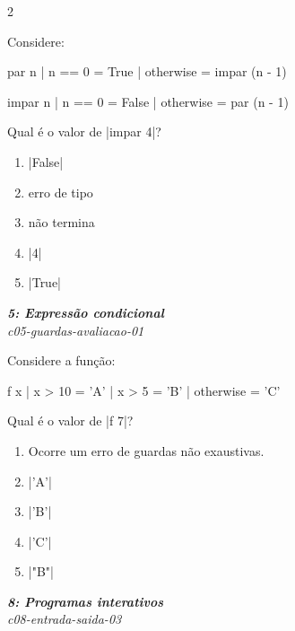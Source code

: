 \documentclass[a4paper,10pt,brazil]{article}
\begin{document}
\begin{multicols}{2}
\begin{flushright}
\end{flushright}
Considere:
\begin{haskellcode}
par n | n == 0 = True
      | otherwise = impar (n - 1)

impar n | n == 0 = False
        | otherwise = par (n - 1)
\end{haskellcode}
Qual é o valor de \haskellinline|impar 4|?

\begin{enumerate}
  \item \haskellinline|False|

  \item erro de tipo

  \item não termina

  \item \haskellinline|4|

  \item \haskellinline|True|


\end{enumerate}

\begin{flushright}
  \footnotesize
  \textit{\textbf{5: Expressão condicional}}\\
  \textit{c05-guardas-avaliacao-01}\\

\end{flushright}
Considere a função:
\begin{haskellcode}
f x
  | x > 10 = 'A'
  | x > 5  = 'B'
  | otherwise = 'C'
\end{haskellcode}
Qual é o valor de \haskellinline|f 7|?

\begin{enumerate}
  \item Ocorre um erro de guardas não exaustivas.

  \item \haskellinline|'A'|

  \item \haskellinline|'B'|

  \item \haskellinline|'C'|

  \item \haskellinline|"B"|


\end{enumerate}

\begin{flushright}
  \footnotesize
  \textit{\textbf{8: Programas interativos}}\\
  \textit{c08-entrada-saida-03}\\


\end{flushright}
\end{multicols}
\end{document}

